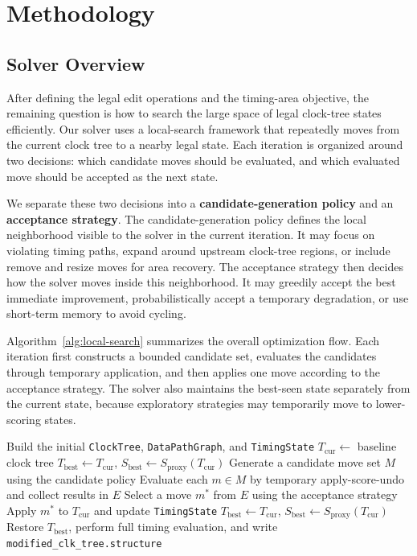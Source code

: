 \documentclass{article}
\begin{document}
\section{Methodology}

\subsection{Solver Overview}

After defining the legal edit operations and the timing-area objective, the remaining question is how to search the large space of legal clock-tree states efficiently. Our solver uses a local-search framework that repeatedly moves from the current clock tree to a nearby legal state. Each iteration is organized around two decisions: which candidate moves should be evaluated, and which evaluated move should be accepted as the next state.

We separate these two decisions into a \textbf{candidate-generation policy} and an \textbf{acceptance strategy}. The candidate-generation policy defines the local neighborhood visible to the solver in the current iteration. It may focus on violating timing paths, expand around upstream clock-tree regions, or include remove and resize moves for area recovery. The acceptance strategy then decides how the solver moves inside this neighborhood. It may greedily accept the best immediate improvement, probabilistically accept a temporary degradation, or use short-term memory to avoid cycling.

Algorithm~\ref{alg:local-search} summarizes the overall optimization flow. Each iteration first constructs a bounded candidate set, evaluates the candidates through temporary application, and then applies one move according to the acceptance strategy. The solver also maintains the best-seen state separately from the current state, because exploratory strategies may temporarily move to lower-scoring states.

\begin{algorithm}[htbp]
  \caption{Overall local-search optimization flow}
  \label{alg:local-search}
  \begin{algorithmic}[1]
    \State Build the initial \texttt{ClockTree}, \texttt{DataPathGraph}, and \texttt{TimingState}
    \State $T_{\mathrm{cur}} \gets$ baseline clock tree
    \State $T_{\mathrm{best}} \gets T_{\mathrm{cur}}$, \quad $S_{\mathrm{best}} \gets S_{\mathrm{proxy}}(T_{\mathrm{cur}})$
    \State Generate a candidate move set $M$ using the candidate policy
    \State Evaluate each $m \in M$ by temporary apply-score-undo and collect results in $E$
    \State Select a move $m^*$ from $E$ using the acceptance strategy
    \State Apply $m^*$ to $T_{\mathrm{cur}}$ and update \texttt{TimingState}
    \State $T_{\mathrm{best}} \gets T_{\mathrm{cur}}$, \quad $S_{\mathrm{best}} \gets S_{\mathrm{proxy}}(T_{\mathrm{cur}})$
    \EndIf
    \EndIf
    \EndWhile
    \State Restore $T_{\mathrm{best}}$, perform full timing evaluation, and write \texttt{modified\_clk\_tree.structure}
    \end{algorithmic}
\end{algorithm}
\end{document}
